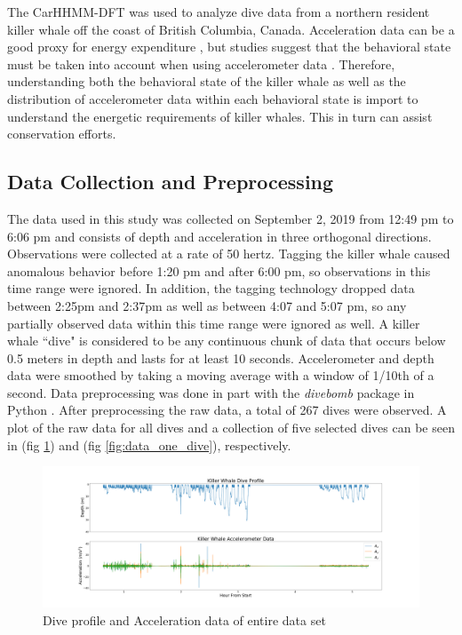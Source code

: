 

The CarHHMM-DFT was used to analyze dive data from a northern resident killer whale off the coast of British Columbia, Canada. Acceleration data can be a good proxy for energy expenditure \citep{Green:2009}, but studies suggest that the behavioral state must be taken into account when using accelerometer data \citep{Dot:2016}. Therefore, understanding both the behavioral state of the killer whale as well as the distribution of accelerometer data within each behavioral state is import to understand the energetic requirements of killer whales. This in turn can assist conservation efforts.

\subsection{Data Collection and Preprocessing}

The data used in this study was collected on September 2, 2019 from 12:49 pm to 6:06 pm and consists of depth and acceleration in three orthogonal directions. Observations were collected at a rate of 50 hertz. Tagging the killer whale caused anomalous behavior before 1:20 pm and after 6:00 pm, so observations in this time range were ignored. In addition, the tagging technology dropped data between 2:25pm and 2:37pm as well as between 4:07 and 5:07 pm, so any partially observed data within this time range were ignored as well. A killer whale ``dive" is considered to be any continuous chunk of data that occurs below 0.5 meters in depth and lasts for at least 10 seconds. Accelerometer and depth data were smoothed by taking a moving average with a window of 1/10th of a second. Data preprocessing was done in part with the \textit{divebomb} package in Python \citep{Nunes:2018}. After preprocessing the raw data, a total of 267 dives were observed. A plot of the raw data for all dives and a collection of five selected dives can be seen in (fig \ref{fig:data}) and (fig \ref{fig:data_one_dive}), respectively.

\begin{figure}[ht]
	\centering
	\includegraphics[width=5in]{../Plots/raw_data.png}
	\caption{Dive profile and Acceleration data of entire data set}
	\label{fig:data}
\end{figure}

